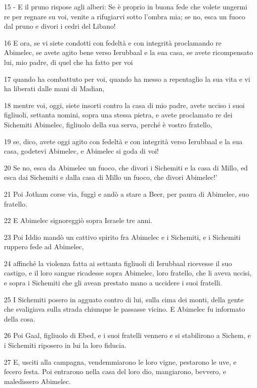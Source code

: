 \par 15 - E il pruno rispose agli alberi: Se è proprio in buona fede che volete ungermi re per regnare su voi, venite a rifugiarvi sotto l'ombra mia; se no, esca un fuoco dal pruno e divori i cedri del Libano!
\par 16 E ora, se vi siete condotti con fedeltà e con integrità proclamando re Abimelec, se avete agito bene verso Ierubbaal e la sua casa, se avete ricompensato lui, mio padre, di quel che ha fatto per voi
\par 17 quando ha combattuto per voi, quando ha messo a repentaglio la sua vita e vi ha liberati dalle mani di Madian,
\par 18 mentre voi, oggi, siete insorti contro la casa di mio padre, avete ucciso i suoi figliuoli, settanta uomini, sopra una stessa pietra, e avete proclamato re dei Sichemiti Abimelec, figliuolo della sua serva, perché è vostro fratello,
\par 19 se, dico, avete oggi agito con fedeltà e con integrità verso Ierubbaal e la sua casa, godetevi Abimelec, e Abimelec si goda di voi!
\par 20 Se no, esca da Abimelec un fuoco, che divori i Sichemiti e la casa di Millo, ed esca dai Sichemiti e dalla casa di Millo un fuoco, che divori Abimelec!'
\par 21 Poi Jotham corse via, fuggì e andò a stare a Beer, per paura di Abimelec, suo fratello.
\par 22 E Abimelec signoreggiò sopra Israele tre anni.
\par 23 Poi Iddio mandò un cattivo spirito fra Abimelec e i Sichemiti, e i Sichemiti ruppero fede ad Abimelec,
\par 24 affinché la violenza fatta ai settanta figliuoli di Ierubbaal ricevesse il suo castigo, e il loro sangue ricadesse sopra Abimelec, loro fratello, che li aveva uccisi, e sopra i Sichemiti che gli avean prestato mano a uccidere i suoi fratelli.
\par 25 I Sichemiti posero in agguato contro di lui, sulla cima dei monti, della gente che svaligiava sulla strada chiunque le passasse vicino. E Abimelec fu informato della cosa.
\par 26 Poi Gaal, figliuolo di Ebed, e i suoi fratelli vennero e si stabilirono a Sichem, e i Sichemiti riposero in lui la loro fiducia.
\par 27 E, usciti alla campagna, vendemmiarono le loro vigne, pestarono le uve, e fecero festa. Poi entrarono nella casa del loro dio, mangiarono, bevvero, e maledissero Abimelec.
